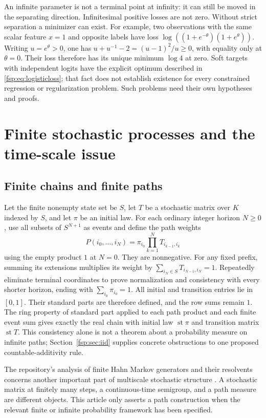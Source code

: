 \documentclass[11pt,a4paper]{article}
\numberwithin{equation}{section}
\theoremstyle{definition}
\theoremstyle{remark}
\newcommand{\st}{\operatorname{st}}
\begin{document}
An infinite parameter is not a terminal point at infinity: it can still
be moved in the separating direction. Infinitesimal positive losses are
not zero. Without strict separation a minimizer can exist.
For example, two observations with the same scalar feature $x=1$ and
opposite labels have loss
$\log((1+e^{-\theta})(1+e^\theta))$.
Writing $u=e^\theta>0$, one has
$u+u^{-1}-2=(u-1)^2/u\ge0$, with equality only at $\theta=0$.
Their loss therefore has its unique minimum $\log4$ at zero. Soft targets
with independent logits have the explicit optimum described in
\eqref{fsp:eq:logisticloss}; that fact does not establish existence for every
constrained regression or regularization problem. Such problems need
their own hypotheses and proofs.

\section{Finite stochastic processes and the time-scale issue}
\label{fsp:sec:processes}

\subsection{Finite chains and finite paths}\label{fsp:sub:paths}

Let the finite nonempty state set be $S$, let $T$ be a stochastic
matrix over $K$ indexed by $S$, and let $\pi$ be an initial law.
For each ordinary integer horizon $N\ge0$, use all subsets of $S^{N+1}$
as events and define the path weights
\begin{equation}
 P(i_0,\ldots,i_N)=\pi_{i_0}\prod_{k=1}^N T_{i_{k-1},i_k}
\end{equation}
using the empty product $1$ at $N=0$. They are nonnegative.
For any fixed prefix, summing its extensions multiplies its weight by
$\sum_{i_N\in S}T_{i_{N-1},i_N}=1$. Repeatedly eliminate terminal
coordinates to prove normalization and consistency with every shorter
horizon, ending with $\sum_{i_0}\pi_{i_0}=1$.
All initial and transition entries lie in $[0,1]$. Their standard parts
are therefore defined, and the row sums remain $1$. The ring property
of standard part applied to each path product and each finite event sum
gives exactly the real chain with initial law $\st\pi$ and transition
matrix $\st T$.
This consistency alone is not a theorem about a probability measure on
infinite paths; Section~\ref{fsp:sec:iid} supplies concrete obstructions to
one proposed countable-additivity rule.

The repository's analysis of finite Hahn Markov generators and their
resolvents concerns another important part of multiscale stochastic
structure \cite{repomarkov}. A stochastic matrix at finitely many steps,
a continuous-time semigroup, and a path measure are different objects.
This article only asserts a path construction when the relevant
finite or infinite probability framework has been specified.
\end{document}
